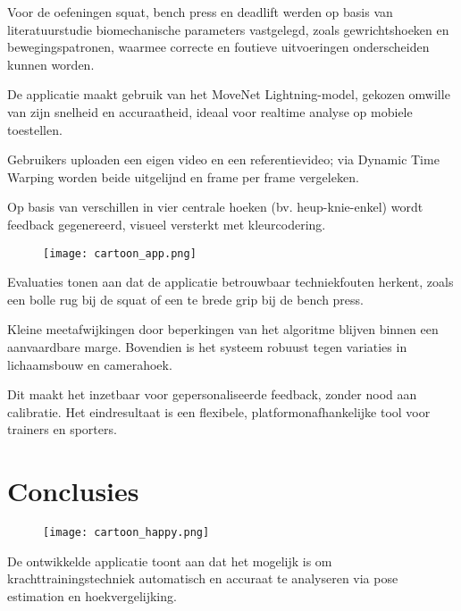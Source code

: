 \documentclass[a0,portrait]{hogent-poster}
\begin{document}
\begin{multicols}{2}
 Voor de oefeningen squat, bench press en deadlift werden op basis van literatuurstudie biomechanische parameters vastgelegd, zoals gewrichtshoeken en bewegingspatronen, waarmee correcte en foutieve uitvoeringen onderscheiden kunnen worden. 

 De applicatie maakt gebruik van het MoveNet Lightning-model, gekozen omwille van zijn snelheid en accuraatheid, ideaal voor realtime analyse op mobiele toestellen. 

 Gebruikers uploaden een eigen video en een referentievideo; via Dynamic Time Warping worden beide uitgelijnd en frame per frame vergeleken. 

 Op basis van verschillen in vier centrale hoeken (bv. heup-knie-enkel) wordt feedback gegenereerd, visueel versterkt met kleurcodering. 

 \vspace{1em}

\begin{wrapfigure}{l}{0.5\linewidth}
  \vspace{-10pt}
  \centering
  \texttt{[image: cartoon\_app.png]}
\end{wrapfigure}

 Evaluaties tonen aan dat de applicatie betrouwbaar techniekfouten herkent, zoals een bolle rug bij de squat of een te brede grip bij de bench press. 

 Kleine meetafwijkingen door beperkingen van het algoritme blijven binnen een aanvaardbare marge. Bovendien is het systeem robuust tegen variaties in lichaamsbouw en camerahoek.

 Dit maakt het inzetbaar voor gepersonaliseerde feedback, zonder nood aan calibratie. Het eindresultaat is een flexibele, platformonafhankelijke tool voor trainers en sporters.

\section{Conclusies}

\begin{wrapfigure}{r}{0.5\linewidth}
  \vspace{-10pt}
  \centering
  \texttt{[image: cartoon\_happy.png]}
\end{wrapfigure}
 
De ontwikkelde applicatie toont aan dat het mogelijk is om krachttrainingstechniek automatisch en accuraat te analyseren via pose estimation en hoekvergelijking. 


\end{multicols}
\end{document}
